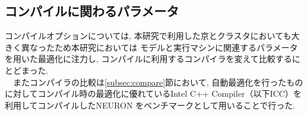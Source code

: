 \subsection{コンパイルに関わるパラメータ}
コンパイルオプションについては, 本研究で利用した京とクラスタにおいても大きく異なったため本研究においては
モデルと実行マシンに関連するパラメータを用いた最適化に注力し, コンパイルに利用するコンパイラを変えて比較するにとどまった.\\
　またコンパイラの比較は\ref{subsec:compare}節において,
自動最適化を行ったものに対してコンパイル時の最適化に優れているIntel C++ Compiler（以下ICC）\cite{icc}を利用してコンパイルしたNEURON
をベンチマークとして用いることで行った.
